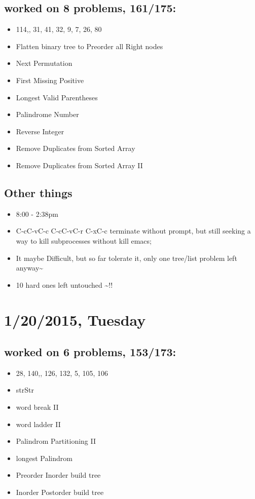 \documentclass[9pt,b5paper]{article}
\begin{document}
\subsection{worked on 8 problems, 161/175:}
\label{sec-6-1}
\begin{itemize}
\item 114,, 31, 41, 32, 9, 7, 26, 80
\item Flatten binary tree to Preorder all Right nodes
\item Next Permutation
\item First Missing Positive
\item Longest Valid Parentheses
\item Palindrome Number
\item Reverse Integer
\item Remove Duplicates from Sorted Array
\item Remove Duplicates from Sorted Array II
\end{itemize}
\subsection{Other things}
\label{sec-6-2}
\begin{itemize}
\item 8:00 - 2:38pm
\item C-cC-vC-c C-cC-vC-r C-xC-c terminate without prompt, but still seeking a way to kill subprocesses without kill emacs;
\item It maybe Difficult, but so far tolerate it, only one tree/list problem left anyway\textasciitilde{}
\item 10 hard ones left untouched \textasciitilde{}!!
\end{itemize}
\section{1/20/2015, Tuesday}
\label{sec-7}
\subsection{worked on 6 problems, 153/173:}
\label{sec-7-1}
\begin{itemize}
\item 28, 140,, 126, 132, 5, 105, 106
\item strStr
\item word break II
\item word ladder II
\item Palindrom Partitioning II
\item longest Palindrom
\item Preorder Inorder build tree
\item Inorder Postorder build tree
\end{itemize}
\end{document}

